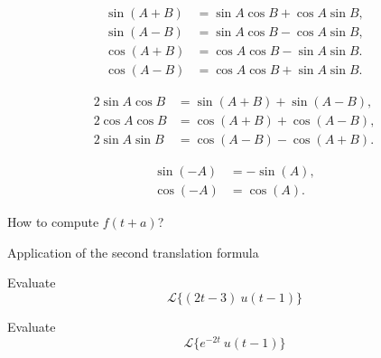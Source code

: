 \documentclass[12pt, a4paper]{article}
\begin{document}
\begin{theorem}
	\begin{align*}
		\sin(A + B) &= \sin A \cos B + \cos A \sin B, \\
		\sin(A - B) &= \sin A \cos B - \cos A \sin B, \\
		\cos(A + B) &= \cos A \cos B - \sin A \sin B.\\
		\cos(A - B) &= \cos A \cos B + \sin A \sin B.
	\end{align*}
\end{theorem}

\vspace{10pt}

\begin{theorem}
	\begin{align*}
		2 \sin A \cos B &= \sin(A+B) + \sin(A-B), \\
		2 \cos A \cos B &= \cos(A+B) + \cos(A-B), \\
		2 \sin A \sin B &= \cos(A-B) - \cos(A+B).
	\end{align*}
\end{theorem}

\vspace{10pt}

\begin{theorem}
	\begin{align*}
		\sin(-A) &= -\sin(A), \\
		\cos(-A) &= \cos(A).
	\end{align*}
\end{theorem}

\clearpage

\begin{heading}
	How to compute $f(t+a)$?
\end{heading}

\clearpage

\begin{heading}
	Application of the second translation formula
\end{heading}

\vspace{10pt}

\begin{problem}
	Evaluate 
	\[\mathcal{L}\{(2t-3) \ u(t-1)\}\]
\end{problem}

\clearpage

\begin{problem}
	Evaluate 
	\[\mathcal{L}\{e^{-2t} \ u(t-1)\}\]
\end{problem}
\end{document}
